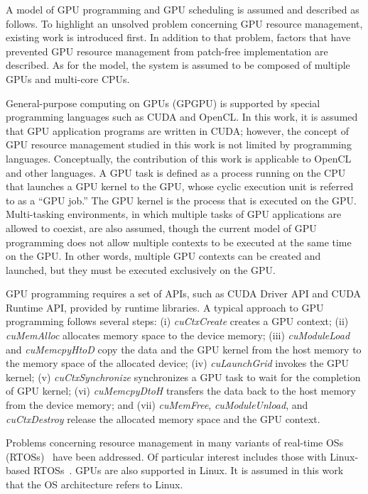 \label{sec:system_model}
A model of GPU programming and GPU scheduling is assumed and described as follows.
To highlight an unsolved problem concerning GPU resource management, existing work is introduced first.
In addition to that problem, factors that have prevented GPU resource management from patch-free implementation are described.
As for the model, the system is assumed to be composed of multiple GPUs and multi-core CPUs.

General-purpose computing on GPUs (GPGPU) is supported by special programming languages such as CUDA and OpenCL.
In this work, it is assumed that GPU application programs are written in CUDA; however, the concept of GPU resource management studied in this work is not limited by programming languages.
Conceptually, the contribution of this work is applicable to OpenCL and other languages.
A GPU task is defined as a process running on the CPU that launches a GPU kernel to the GPU, whose cyclic execution unit is referred to as a ``GPU job.''
The GPU kernel is the process that is executed on the GPU.
Multi-tasking environments, in which multiple tasks of GPU applications are allowed to coexist, are also assumed, though the current model of GPU programming does not allow multiple contexts to be executed at the same time on the GPU.
In other words, multiple GPU contexts can be created and launched, but they must be executed exclusively on the GPU.

GPU programming requires a set of APIs, such as CUDA Driver API and CUDA Runtime API, provided by runtime libraries.
A typical approach to GPU programming follows several steps: (i) \textit{cuCtxCreate} creates a GPU context; (ii) \textit{cuMemAlloc} allocates memory space to the device memory; (iii) \textit{cuModuleLoad} and \textit{cuMemcpyHtoD} copy the data and the GPU kernel from the host memory to the memory space of the allocated device; (iv) \textit{cuLaunchGrid} invokes the GPU kernel; (v) \textit{cuCtxSynchronize} synchronizes a GPU task to wait for the completion of GPU kernel; (vi) \textit{cuMemcpyDtoH} transfers the data back to the host memory from the device memory; and (vii) \textit{cuMemFree}, \textit{cuModuleUnload}, and \textit{cuCtxDestroy} release the allocated memory space and the GPU context.

Problems concerning resource management in many variants of real-time OSs (RTOSs)~\cite{spring,redline,itron,rk} have been addressed.
Of particular interest includes those with Linux-based RTOSs~\cite{litmus,prk,rtai,yodaiken1999rtlinux,kato2009loadable}.
GPUs are also supported in Linux.
It is assumed in this work that the OS architecture refers to Linux.

